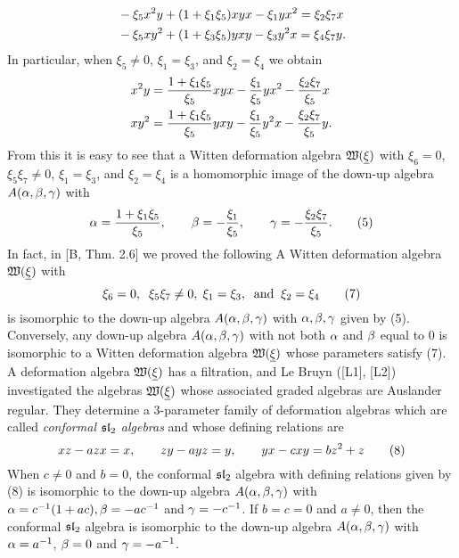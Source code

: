       $$\aligned & -\xi_5 x^2y + (1  + \xi_1\xi_5)xyx - \xi_1yx^2 = \xi_2 \xi_7 x
      \\
      & -\xi_5 xy^2 + (1+\xi_3\xi_5)yxy -\xi_3 y^2 x = \xi_4 \xi_7 y. \\
      \endaligned $$
      \n In particular, when $\xi_5 \neq 0$, $\xi_1 = \xi_3$,
      and $\xi_2 = \xi_4$ we obtain
      $$
      \aligned
      & x^2 y = \frac{1+\xi_1 \xi_5}{\xi_5} xyx - \frac{\xi_1}{\xi_5}yx^2 - 
      \frac{\xi_2 \xi_7}{\xi_5} x \\
      & x y^2 = \frac{1+\xi_1 \xi_5}{\xi_5} yxy - \frac{\xi_1}{\xi_5}y^2x - 
      \frac{\xi_2 \xi_7}{\xi_5}y. \\
      \endaligned$$
      \n From this it is easy to see that 
      a Witten deformation algebra ${\frak W}(\underline \xi)  $ with
      $\xi_6 = 0$, $\xi_5\xi_7 \neq 0$, $\xi_1 = \xi_3$,
      and $\xi_2 = \xi_4$ is a homomorphic image
      of the down-up algebra $A(\alpha,\beta,\gamma)$ 
      with
      $$\a = \frac{1+\xi_1 \xi_5}{\xi_5}, \quad \quad 
      \be = - \frac{\xi_1}{\xi_5}, \quad \quad \gamma = -\frac{\xi_2
      \xi_7}{\xi_5}. \tag 5$$
      \n In fact, in [B, Thm. 2.6] we proved the following
      \m
       A Witten deformation algebra ${\frak W}(\underline \xi)  $
      with
      $$\xi_6 = 0, \;\; \xi_5\xi_7 \neq 0, \; \xi_1 = \xi_3, \; \;\text{and}
      \;\;\xi_2 = \xi_4 \tag 7$$
      \n is isomorphic to the down-up algebra $A(\alpha,\beta,\gamma)$
      with $\alpha,\beta,\gamma$ given by (5). Conversely, any
      down-up algebra $A(\alpha,\beta,\gamma)$ with not both $\alpha$ and $\beta$
      equal to 0 is isomorphic to a Witten deformation algebra ${\frak W}(\underline \xi)  $
      whose parameters satisfy (7). \endproclaim 
      \m
      A deformation algebra ${\frak W}(\underline \xi)  $
      has a filtration,  and 
      Le Bruyn ([L1], [L2]) investigated the algebras ${\frak W}(\underline \xi)  $ 
      whose associated graded algebras are Auslander regular. 
      They determine a 3-parameter family of deformation algebras which
      are called {\it conformal $\frak s\frak l_2$ algebras} and whose defining relations
      are 
      $$xz - a zx = x, \quad \quad 
      zy - a yz = y, \quad \quad yx - c xy = b z^2 + z  \tag 8$$
      \n When $c \neq 0$ and $b = 0$, the conformal $\frak s\frak l_2$ algebra
      with defining relations given by (8) is isomorphic to
      the down-up algebra $A(\alpha,\beta,\gamma)$ with
      $\alpha = c^{-1}(1+ac), \beta = -ac^{-1}$ and $\gamma = -c^{-1}$.
      If $b= c = 0$ and $a \neq 0$, then the conformal $\frak s\frak l_2$ algebra
      is isomorphic to the down-up algebra $A(\alpha,\beta,\gamma)$
      with $\alpha = a^{-1}$, $\beta = 0$ and $\gamma = -a^{-1}$.    
